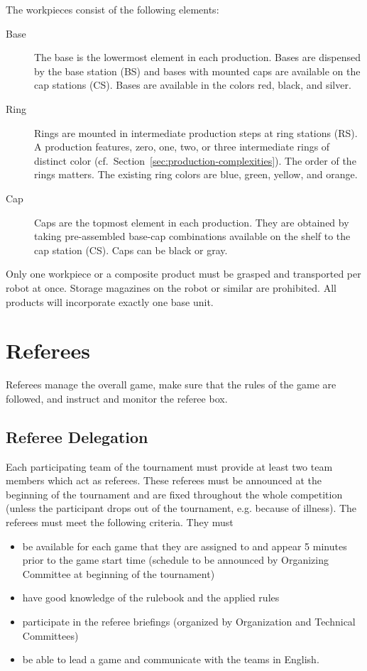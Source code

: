 \documentclass[12pt,twoside]{article}
\newcommand{\refsec}[1]{Section~\ref{#1}}
\begin{document}
\noindent
The workpieces consist of the following elements:
\begin{description}
\item[Base] The base is the lowermost element in each production.
  Bases are dispensed by the base station (BS) and bases with mounted 
  caps are available on the cap stations (CS). Bases are available in the 
  colors red, black, and silver.
\item[Ring] Rings are mounted in intermediate production steps at ring
  stations (RS). A production features, zero, one, two, or three
  intermediate rings of distinct color
  (cf.~\refsec{sec:production-complexities}). The order of the rings
  matters. The existing ring colors are blue, green, yellow, and
  orange.
\item[Cap] Caps are the topmost element in each production. They are
  obtained by taking pre-assembled base-cap combinations available on
  the shelf to the cap station (CS). Caps can be black or gray.

\end{description}
Only one workpiece or a composite product must be grasped and transported 
per robot at once. Storage magazines on the robot or similar are prohibited. All products will incorporate exactly one base unit.

\section{Referees}
Referees manage the overall game, make sure that the rules of the game
are followed, and instruct and monitor the referee box.

\subsection{Referee Delegation}
Each participating team of the tournament must provide at least two
team members which act as referees. These referees must be announced
at the beginning of the tournament and are fixed throughout the whole
competition (unless the participant drops out of the tournament,
e.g. because of illness). The referees must meet the following
criteria. They must

\begin{itemize}
\item be available for each game that they are assigned to and appear
  5 minutes prior to the game start time (schedule to be announced by
  Organizing Committee at beginning of the tournament)
\item have good knowledge of the rulebook and the applied rules
\item participate in the referee briefings (organized by Organization
  and Technical Committees)
\item be able to lead a game and communicate with the teams in
  English.
\end{itemize}
\end{document}
